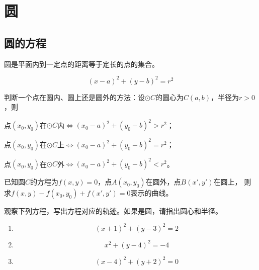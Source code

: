 \section{圆}
\subsection{圆的方程}
\begin{definition}
    圆是平面内到一定点的距离等于定长的点的集合。
\end{definition}
\begin{theorem}[圆的标准方程]
    \begin{equation}
        (x-a)^2+(y-b)^2=r^2
    \end{equation}
\end{theorem}

\begin{corollary}[圆与点的位置关系]
    判断一个点在圆内、圆上还是圆外的方法：设\(\odot C\)的圆心为$C(a,b)$，半径为\(r>0\)，则
    
    点$(x_0,y_0)$在\(\odot C\)内\(\Leftrightarrow   (x_0-a)^2+(y_0-b)^2>r^2\)；

    点$(x_0,y_0)$在\(\odot C\)上\(\Leftrightarrow   (x_0-a)^2+(y_0-b)^2=r^2\)；

    点$(x_0,y_0)$在\(\odot C\)外\(\Leftrightarrow   (x_0-a)^2+(y_0-b)^2<r^2\)。
\end{corollary}
\begin{example}
    已知圆\(C\)的方程为\(f(x,y)=0\)，点\(A(x_0,y_0)\)在圆外，点\(B(x',y')\)在圆上，
    则求\(f(x,y)-f(x_0,y_0)+f(x',y')=0\)表示的曲线。
\end{example}
\begin{exercise}
    观察下列方程，写出方程对应的轨迹。如果是圆，请指出圆心和半径。
    \begin{enumerate}
        \item \[(x+1)^2+(y-3)^2=2\]
        \item \[x^2+(y-4)^2=-4\]
        \item \[(x-4)^2+(y+2)^2=0\]
    \end{enumerate}
\end{exercise}

